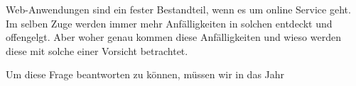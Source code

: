 Web-Anwendungen sind ein fester Bestandteil, wenn es um online Service geht.
Im selben Zuge werden immer mehr Anfälligkeiten in solchen entdeckt und offengelgt. Aber woher genau kommen diese Anfälligkeiten und wieso werden diese mit solche einer Vorsicht betrachtet.

Um diese Frage beantworten zu können, müssen wir in das Jahr 